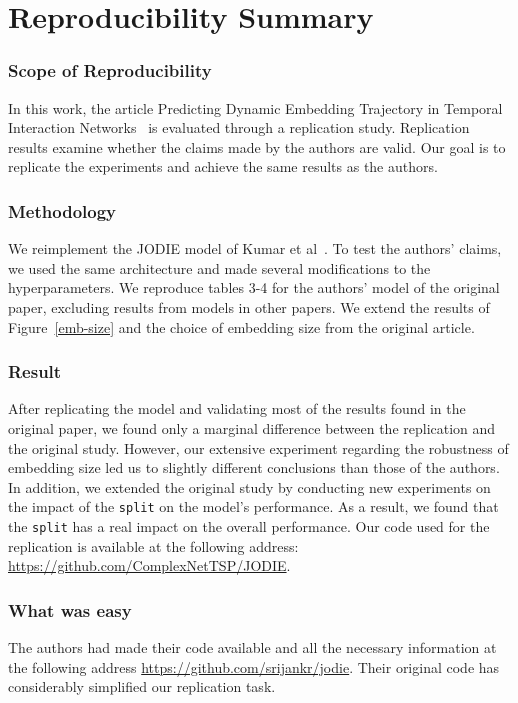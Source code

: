 

\newcommand{\amel}[1]{{\color{orange} #1}} 

\section*{Reproducibility Summary}


\subsubsection{Scope of Reproducibility}
In this work, the article Predicting Dynamic Embedding Trajectory in Temporal Interaction Networks~\cite{kumar2019predicting} is evaluated through a replication study. Replication results examine whether the claims made by the authors are valid. Our goal is to replicate the experiments and achieve the same results as the authors.

\subsubsection{Methodology}
We reimplement the JODIE model of Kumar et al~\cite{kumar2019predicting}. To test the authors' claims, we used the same architecture and made several modifications to the hyperparameters. We reproduce tables 3-4 for the authors' model of the original paper, excluding results from models in other papers. We extend the results of Figure~\ref{emb-size} and the choice of embedding size from the original article.


\subsubsection{Result}
After replicating the model and validating most of the results found in the original paper, we found only a marginal difference between the replication and the original study. However, our extensive experiment regarding the robustness of embedding size led us to slightly different conclusions than those of the authors. In addition, we extended the original study by conducting new experiments on the impact of the \texttt{split} on the model's performance. As a result, we found that the \texttt{split} has a real impact on the overall performance. Our code used for the replication is available at the following address: \url{https://github.com/ComplexNetTSP/JODIE}.

\subsubsection{What was easy}
The authors had made their code available and all the necessary information at the following address \url{https://github.com/srijankr/jodie}. Their original code has considerably simplified our replication task.

